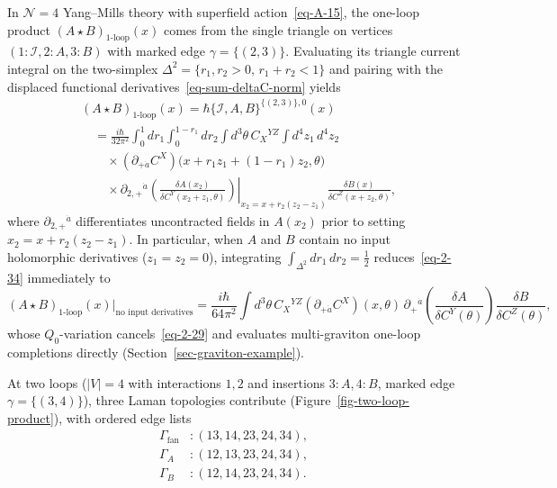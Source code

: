 \documentclass[11pt]{article}
\numberwithin{equation}{section}
\numberwithin{figure}{section}
\numberwithin{table}{section}
\begin{document}
In $\mathcal N=4$ Yang--Mills theory with superfield action~\eqref{eq-A-15}, the one-loop product $(A\star B)_{\mathrm{1\text{-}loop}}(x)$ comes from the single triangle on vertices $(1:\mathcal I,2:A,3:B)$ with marked edge $\gamma=\{(2,3)\}$. Evaluating its triangle current integral on the two-simplex $\Delta^2=\{r_1,r_2>0,\,r_1+r_2<1\}$ and pairing with the displaced functional derivatives~\eqref{eq-sum-deltaC-norm} yields
\begin{equation}\label{eq-2-34}
\begin{aligned}
&(A\star B)_{\mathrm{1\text{-}loop}}(x)
=\hbar\{\mathcal I,A,B\}^{\{(2,3)\},0}(x)
\\
&\quad=\frac{i\hbar}{32\pi^2}\int_0^1dr_1\int_0^{1-r_1}dr_2
\int d^3\theta\,C_X{}^{YZ}
\int d^4z_1\,d^4z_2\\
&\qquad\times(\partial_{+\dot a}C^X)
\big(x+r_1z_1+(1-r_1)z_2,\theta\big)\\
&\qquad\times\left.
\partial_{2,+}{}^{\dot a}
\left(\frac{\delta A(x_2)}{\delta C^Y(x_2+z_1,\theta)}\right)
\right|_{x_2=x+r_2(z_2-z_1)}
\frac{\delta B(x)}{\delta C^Z(x+z_2,\theta)},
\end{aligned}
\end{equation}
where $\partial_{2,+}{}^{\dot a}$ differentiates uncontracted fields in $A(x_2)$ prior to setting $x_2=x+r_2(z_2-z_1)$. In particular, when $A$ and $B$ contain no input holomorphic derivatives ($z_1=z_2=0$), integrating $\int_{\Delta^2}dr_1\,dr_2=\tfrac12$ reduces~\eqref{eq-2-34} immediately to
\begin{equation*}
(A\star B)_{\mathrm{1\text{-}loop}}(x)\big|_{\text{no input derivatives}}
=\frac{i\hbar}{64\pi^2}\int d^3\theta\,C_X{}^{YZ}
(\partial_{+\dot a}C^X)(x,\theta)\,
\partial_+{}^{\dot a}\!\left(\frac{\delta A}{\delta C^Y(\theta)}\right)
\frac{\delta B}{\delta C^Z(\theta)},
\end{equation*}
whose $Q_0$-variation cancels~\eqref{eq-2-29} and evaluates multi-graviton one-loop completions directly (Section~\ref{sec-graviton-example}).

At two loops ($|V|=4$ with interactions $1,2$ and insertions $3:A,4:B$, marked edge $\gamma=\{(3,4)\}$), three Laman topologies contribute (Figure~\ref{fig-two-loop-product}), with ordered edge lists
\begin{equation}\label{eq-productedges}
\begin{aligned}
\Gamma_{\mathrm{fan}}&:(13,14,23,24,34),\\
\Gamma_A&:(12,13,23,24,34),\\
\Gamma_B&:(12,14,23,24,34).
\end{aligned}
\end{equation}
\end{document}
